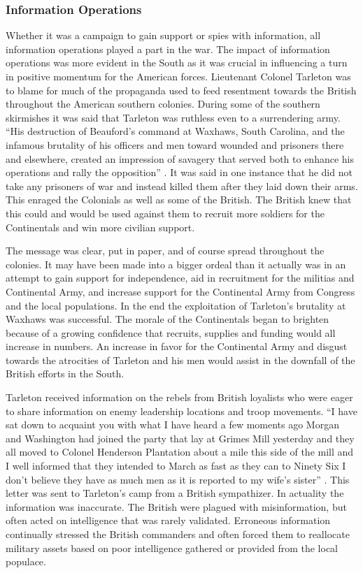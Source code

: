 \subsubsection{Information Operations}

Whether it was a campaign to gain support or spies with information, all
information operations played a part in the war.  The impact of information
operations was more evident in the South as it was crucial in influencing a turn
in positive momentum for the American forces. Lieutenant Colonel Tarleton was to
blame for much of the propaganda used to feed resentment towards the British
throughout the American southern colonies. During some of the southern
skirmishes it was said that Tarleton was ruthless even to a surrendering army.
“His destruction of Beauford’s command at Waxhaws, South Carolina, and the
infamous brutality of his officers and men toward wounded and prisoners there
and elsewhere, created an impression of savagery that served both to enhance his
operations and rally the opposition” \cite[p.44]{babits_devil_2001}.  It was said in one
instance that he did not take any prisoners of war and instead killed them after
they laid down their arms. This enraged the Colonials as well as some of the
British.  The British knew that this could and would be used against them to
recruit more soldiers for the Continentals and win more civilian support.  

The message was clear, put in paper, and of course spread throughout the
colonies.  It may have been made into a bigger ordeal than it actually was in an
attempt to gain support for independence, aid in recruitment for the militias
and Continental Army, and increase support for the Continental Army from
Congress and the local populations.  In the end the exploitation of Tarleton’s
brutality at Waxhaws was successful. The morale of the Continentals began to
brighten because of a growing confidence that recruits, supplies and funding
would all increase in numbers. An increase in favor for the Continental Army and
disgust towards the atrocities of Tarleton and his men would assist in the
downfall of the British efforts in the South.

Tarleton received information on the rebels from British loyalists who were
eager to share information on enemy leadership locations and troop movements. “I
have sat down to acquaint you with what I have heard a few moments ago Morgan
and Washington had joined the party that lay at Grimes Mill yesterday and they
all moved to Colonel Henderson Plantation about a mile this side of the mill and
I well informed that they intended to March as fast as they can to Ninety Six I
don’t believe they have as much men as it is reported to my wife’s sister”
\cite[p.182]{moncure_cowpens_1996}.  This letter was sent to Tarleton’s camp from a British
sympathizer.  In actuality the information was inaccurate.  The British were
plagued with misinformation, but often acted on intelligence that was rarely
validated.  Erroneous information continually stressed the British commanders
and often forced them to reallocate military assets based on poor intelligence
gathered or provided from the local populace.   

